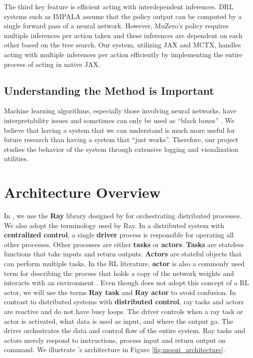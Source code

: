 The third key feature is efficient acting with interdependent inferences.
DRL systems such as IMPALA assume that the policy output can be computed by a single forward pass of a neural network.
However, MuZero's policy requires multiple inferences per action taken and these inferences are dependent on each other based on the tree search.
Our system, utilizing JAX and MCTX, handles acting with multiple inferences per action efficiently by implementing the entire process of acting in native JAX.

\subsection{Understanding the Method is Important}
Machine learning algorithms, especially those involving neural networks, have interpretability issues and sometimes can only be used as ``black boxes'' \cite{ExplainableAIReview_Linardatos.Papastefanopoulos.ea_2021}.
We believe that having a system that we can understand is much more useful for future research than having a system that ``just works''.
Therefore, our project studies the behavior of the system through extensive logging and visualization utilities.

\section{Architecture Overview}
In \moozi, we use the \textbf{Ray} library designed by \citeauthor{RayDistributedFramework_Moritz.Nishihara.ea_2018} \cite{RayDistributedFramework_Moritz.Nishihara.ea_2018} for orchestrating distributed processes.
We also adopt the terminology used by Ray.
In a distributed system with \textbf{centralized control}, a single \textbf{driver} process is responsible for operating all other processes.
Other processes are either \textbf{tasks} or \textbf{actors}.
\textbf{Tasks} are stateless functions that take inputs and return outputs.
\textbf{Actors} are stateful objects that can perform multiple tasks.
In the RL literature, \textbf{actor} is also a commonly used term for describing the process that holds a copy of the network weights and interacts with an environment \cite{SEEDRLScalable_Espeholt.Marinier.ea_2020, IMPALAScalableDistributed_Espeholt.Soyer.ea_2018}.
Even though \moozi does not adopt this concept of a RL actor, we will use the terms \textbf{Ray task} and \textbf{Ray actor} to avoid confusion.
In contrast to distributed systems with \textbf{distributed control}, ray tasks and actors are reactive and do not have busy loops.
The driver controls when a ray task or actor is activated, what data is used as input, and where the output go.
The driver orchestrates the data and control flow of the entire system.
Ray tasks and actors merely respond to instructions, process input and return output on command.
We illustrate \moozi's architecture in Figure \ref{fig:moozi_architecture}.

